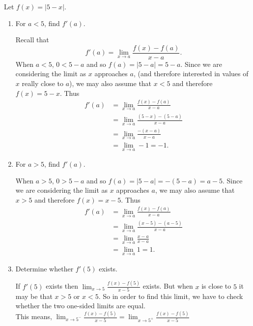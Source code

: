 \documentclass[nooutcomes]{ximera}
\begin{document}
	
\begin{problem}
Let $f(x) = |5-x|$.
	
	\begin{enumerate}
	
	\item For $a < 5$, find $f'(a)$.
	
		\begin{freeResponse}
		Recall that 
		$$f'(a) = \lim_{x \to a} \frac{f(x) - f(a)}{x-a}.$$
		When $a < 5$, $0 < 5-a$ and so $f(a) = |5-a| = 5-a$.  Since we are considering the limit as $x$ approaches $a$, (and therefore interested in values of $x$  really close to $a$), we may also assume that $x < 5$ and therefore $f(x) = 5-x$.  Thus
		\begin{align*}
		f'(a) &= \lim_{x \to a} \frac{f(x) - f(a)}{x-a}  \\
		&= \lim_{x \to a} \frac{(5-x) - (5-a)}{x-a}  \\
		&= \lim_{x \to a} \frac{-(x-a)}{x-a}  \\
		&= \lim_{x \to a} -1 = -1.
		\end{align*}

		\end{freeResponse}

	\item For $a > 5$, find $f'(a)$.
	
		\begin{freeResponse}
		When $a > 5$, $0 > 5-a$ and so $f(a) = |5-a| = -(5-a) = a-5$.  Since we are considering the limit as $x$ approaches $a$, we may also assume that $x > 5$ and therefore $f(x) = x-5$.  Thus
		\begin{align*}
		f'(a) &= \lim_{x \to a} \frac{f(x) - f(a)}{x-a}  \\
		&= \lim_{x \to a} \frac{(x-5) - (a-5)}{x-a}  \\
		&= \lim_{x \to a} \frac{x-a}{x-a}  \\
		&= \lim_{x \to a} 1 = 1.
		\end{align*}

		\end{freeResponse}
	\item Determine whether $f'(5)$ exists.  
	
		\begin{freeResponse}
		If  $f'(5)$ exists then $\lim_{x \to 5} \frac{f(x) - f(5)}{x-5}$ exists.  But when $x$ is close to $5$ it may be that $x>5$ or $x<5$.   So in order to find this limit, we have to check whether the two one-sided limits are equal.\\
		This means,  $\lim_{x \to 5^-} \frac{f(x) - f(5)}{x-5}=\lim_{x \to 5^+} \frac{f(x) - f(5)}{x-5}$\\ 



\end{freeResponse}
\end{enumerate}
\end{problem}
\end{document}
